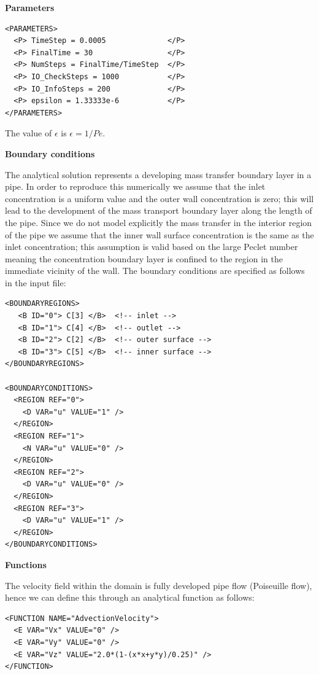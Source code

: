 \textbf{\footnotesize{Parameters}}

\begin{lstlisting}[style=XMLStyle]
<PARAMETERS>
  <P> TimeStep = 0.0005              </P>
  <P> FinalTime = 30                 </P>
  <P> NumSteps = FinalTime/TimeStep  </P>
  <P> IO_CheckSteps = 1000           </P>
  <P> IO_InfoSteps = 200             </P>
  <P> epsilon = 1.33333e-6           </P>
</PARAMETERS>
\end{lstlisting}

The value of $\epsilon$ is $\epsilon = 1/Pe$.

\textbf{\footnotesize{Boundary conditions}}

The analytical solution represents a developing mass transfer boundary layer in a pipe. In order to 
reproduce this numerically we assume that the inlet concentration is a uniform value and the outer 
wall concentration is zero; this will lead to the development of the mass transport boundary layer along the length 
of the pipe. Since we do not model explicitly the mass transfer in the interior region of the pipe we assume that 
the inner wall surface concentration is the same as the inlet concentration; this assumption is valid based on the large 
Peclet number meaning the concentration boundary layer is confined to the region in the immediate vicinity of the wall.
 The boundary conditions are specified as follows in the input file:

\begin{lstlisting}[style=XMLStyle]
<BOUNDARYREGIONS>
   <B ID="0"> C[3] </B>  <!-- inlet -->
   <B ID="1"> C[4] </B>  <!-- outlet -->
   <B ID="2"> C[2] </B>  <!-- outer surface -->
   <B ID="3"> C[5] </B>  <!-- inner surface -->
</BOUNDARYREGIONS>

<BOUNDARYCONDITIONS>
  <REGION REF="0">
    <D VAR="u" VALUE="1" />
  </REGION>
  <REGION REF="1">
    <N VAR="u" VALUE="0" />
  </REGION>
  <REGION REF="2">
    <D VAR="u" VALUE="0" />
  </REGION>
  <REGION REF="3">
    <D VAR="u" VALUE="1" />
  </REGION>
</BOUNDARYCONDITIONS>
\end{lstlisting}


\textbf{\footnotesize{Functions}}

The velocity field within the domain is fully developed pipe flow (Poiseuille flow), hence we 
can define this through an analytical function as follows:

\begin{lstlisting}[style=XMLStyle]
<FUNCTION NAME="AdvectionVelocity">
  <E VAR="Vx" VALUE="0" />
  <E VAR="Vy" VALUE="0" />
  <E VAR="Vz" VALUE="2.0*(1-(x*x+y*y)/0.25)" />
</FUNCTION>
\end{lstlisting}

